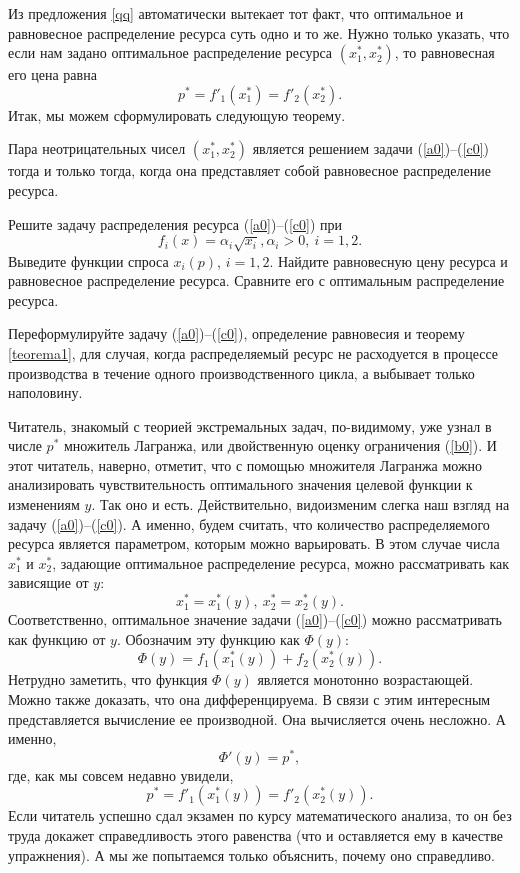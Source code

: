Из предложения \ref{qq} автоматически вытекает тот факт, что
оптимальное и равновесное распределение ресурса суть одно и то же.
Нужно только указать, что если нам задано оптимальное распределение
ресурса $(x_{1}^{*},x_{2}^{*})$, то равновесная его цена равна
\[p^{*}=f'_{1}(x_{1}^{*})=f'_{2}(x_{2}^{*}).\]
Итак, мы можем сформулировать следующую теорему.

\begin{teo}
\label{teorema1} Пара неотрицательных чисел $(x_{1}^{*},x_{2}^{*})$
является решением задачи (\ref{a0})--(\ref{c0}) тогда и только
тогда, когда она представляет собой равновесное распределение
ресурса.
\end{teo}

\begin{exer}
    \label{CES1}
    Решите задачу распределения ресурса (\ref{a0})--(\ref{c0}) при
\[f_{i}(x)=\alpha_{i}\sqrt{x_{i}}, \alpha_{i}>0, \ i=1,2.\]
Выведите функции спроса $x_{i}(p)$, $i=1,2$. Найдите равновесную
цену ресурса и равновесное распределение ресурса. Сравните его с
оптимальным распределение ресурса.
\end{exer}

\begin{exer}
    Переформулируйте задачу (\ref{a0})--(\ref{c0}), определение
    равновесия и теорему \ref{teorema1}, для случая, когда распределяемый
    ресурс не расходуется в процессе производства в течение одного
    производственного цикла, а выбывает только наполовину.
\end{exer}

Читатель, знакомый с теорией экстремальных задач, по-видимому, уже
узнал в числе $p^{*}$ множитель Лагранжа, или двойственную оценку
ограничения (\ref{b0}). И этот читатель, наверно, отметит, что с
помощью множителя Лагранжа можно анализировать чувствительность
оптимального значения целевой функции к изменениям $y$. Так оно и
есть.
 Действительно, видоизменим слегка наш взгляд на задачу
(\ref{a0})--(\ref{c0}). А именно, будем считать, что количество
распределяемого ресурса является параметром, которым можно
варьировать. В этом случае числа $x_{1}^{*}$ и $x_{2}^{*}$, задающие
оптимальное распределение ресурса,  можно рассматривать как
зависящие от $y$:
\[x_{1}^{*}=x_{1}^{*}(y),\ x_{2}^{*}=x_{2}^{*}(y).\]
Соответственно, оптимальное значение задачи (\ref{a0})--(\ref{c0})
можно рассматривать как функцию от $y$. Обозначим эту функцию как
$\Phi(y)$:
\begin{equation}
\label{fi} \Phi(y)=f_{1}(x_{1}^{*}(y))+f_{2}(x_{2}^{*}(y)).
\end{equation}
Нетрудно заметить, что функция $\Phi(y)$ является монотонно
возрастающей. Можно также доказать, что она дифференцируема. В связи
с этим интересным представляется вычисление ее производной. Она
вычисляется очень несложно. А именно,
\begin{equation}
\label{dd}
\Phi'(y)=p^{*},
\end{equation}
где, как мы совсем недавно увидели,
\[p^{*}=f'_{1}(x_{1}^{*}(y))=f'_{2}(x_{2}^{*}(y)).\]
Если читатель успешно сдал экзамен по курсу математического анализа,
то он без труда докажет справедливость этого равенства (что и
оставляется ему в качестве упражнения). А мы же попытаемся только
объяснить, почему оно справедливо.

